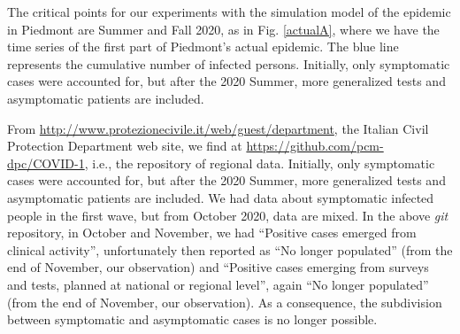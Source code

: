 \documentclass[graybox]{svmult}
\begin{document}
The critical points for our experiments with the simulation model of the epidemic in Piedmont are Summer and Fall 2020, as in Fig. \ref{actualA}, where we have the time series of the first part of Piedmont's actual epidemic. The blue line represents the cumulative number of infected persons. Initially, only symptomatic cases were accounted for, but after the 2020 Summer, more generalized tests and asymptomatic patients are included.  

From \href{http://www.protezionecivile.it/web/guest/department}{http://www.protezionecivile.it/web/guest/department}, the Italian Civil Protection Department web site, we find at  \href{https://github.com/pcm-dpc/COVID-19}{https://github.com/pcm-dpc/COVID-1}, i.e., the repository of regional data. Initially, only symptomatic cases were accounted for, but after the 2020 Summer, more generalized tests and asymptomatic patients are included. We had data about symptomatic infected people in the first wave, but from October 2020, data are mixed. In the above \emph{git}  repository, in October and November, we had ``Positive cases emerged from clinical activity'', unfortunately then reported as ``No longer populated'' (from the end of November, our observation) and ``Positive cases emerging from surveys and tests, planned at national or regional level'', again ``No longer populated'' (from the end of November, our observation). As a consequence, the subdivision between symptomatic and asymptomatic cases is no longer possible.
\end{document}
